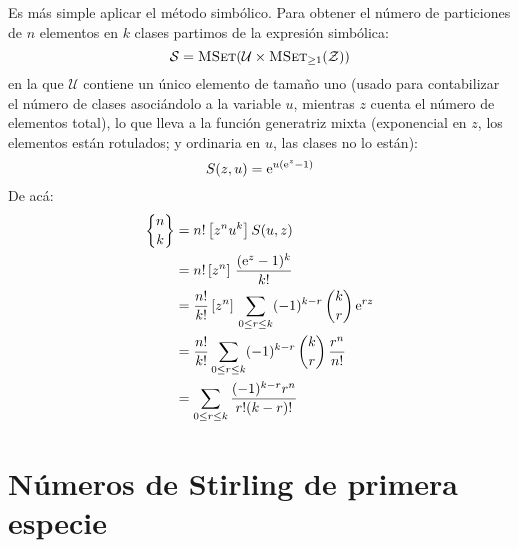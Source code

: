   Es más simple aplicar el método simbólico.%
  Para obtener el número de particiones de \(n\) elementos en \(k\) clases
  partimos de la expresión simbólica:
  \begin{equation*}
    \mathcal{S}
      = \operatorname{\textsc{MSet}}(\mathcal{U} \times \operatorname{\textsc{MSet}}_{\ge 1}(\mathcal{Z}))
  \end{equation*}
  en la que \(\mathcal{U}\) contiene un único elemento de tamaño uno
  (usado para contabilizar el número de clases
   asociándolo a la variable \(u\),
   mientras \(z\) cuenta el número de elementos total),
  lo que lleva a la función generatriz mixta%
  (exponencial en \(z\),
   los elementos están rotulados;
   y ordinaria en \(u\),
   las clases no lo están):
  \begin{equation}
    \label{eq:Stirling-2-EGF}
    \index{Stirling, numeros de@Stirling, números de!segunda especie!funcion generatriz@función generatriz}
    S(z, u)
      = \mathrm{e}^{u (\mathrm{e}^z - 1)}
  \end{equation}
  De acá:
  \begin{align}
    \classes{n}{k}
      &= n! \left[ z^n u^k \right] S(u, z) \notag \\
      &= n! \left[ z^n \right] \, \frac{(\mathrm{e}^z - 1)^k}{k!} \notag \\
      &= \frac{n!}{k!} \left[ z^n \right] \,
	    \sum_{0 \le r \le k} (-1)^{k - r} \,
	       \binom{k}{r} \, \mathrm{e}^{r z} \notag \\
      &= \frac{n!}{k!}
	    \sum_{0 \le r \le k} (-1)^{k - r} \, \binom{k}{r} \, \frac{r^n}{n!}
		\notag \\
      &= \sum_{0 \le r \le k} \frac{(-1)^{k - r} r^n}{r! (k - r)!}
		\label{eq:Stirling-2-explicit}
  \end{align}

\section{Números de Stirling de primera especie}
\label{sec:Stirling-1}

